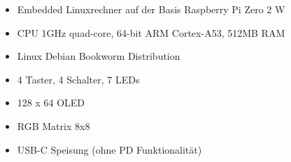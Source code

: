 
\begin{itemize}
    \item Embedded Linuxrechner auf der Basis Raspberry Pi Zero 2 W
    \item CPU 1GHz quad-core, 64-bit ARM Cortex-A53, 512MB RAM
    \item Linux Debian Bookworm Distribution
    \item 4 Taster, 4 Schalter, 7 LEDs
    \item 128 x 64 OLED
    \item RGB Matrix 8x8
    \item USB-C Speisung (ohne PD Funktionalität)
\end{itemize}
